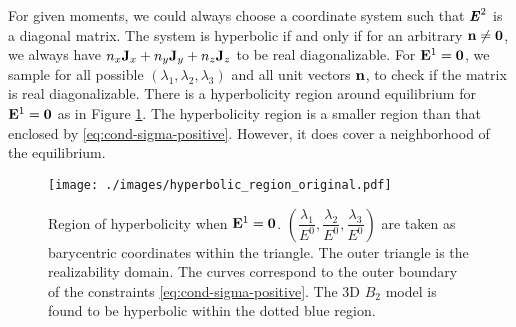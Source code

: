 For given moments, we could always choose a
coordinate system such that $\boldsymbol{\mathit{E}}^2$ is a diagonal matrix. The
system is hyperbolic if and only if for an arbitrary
$\mathbf{n} \not= \boldsymbol{0}$, we always have
$n_x \mathbf{J}_x + n_y \mathbf{J}_y + n_z \mathbf{J}_z$ to be real diagonalizable.
For $\mathbf{E}^1 = \boldsymbol{0}$, we sample for all possible
$(\lambda_1, \lambda_2, \lambda_3)$ and all unit vectors $\mathbf{n}$, to
check if the matrix is real diagonalizable.
There is a hyperbolicity region around equilibrium for $\mathbf{E}^1 =
\boldsymbol{0}$ as in Figure \ref{fig:hyperbolic_region}. 
The hyperbolicity region is a smaller
region than that enclosed by \eqref{eq:cond-sigma-positive}. However, it does cover a
neighborhood of the equilibrium.
\begin{figure}  
  \centering
  \texttt{[image: ./images/hyperbolic\_region\_original.pdf]}
  \caption{Region of hyperbolicity when $\mathbf{E}^1 = \boldsymbol{0}$.
    $\left(\dfrac{\lambda_1}{E^0},\dfrac{\lambda_2}{E^0},
    \dfrac{\lambda_3}{E^0}\right)$ are taken as barycentric coordinates within the 
    triangle. The outer triangle is the realizability domain. The curves
    correspond to the outer boundary of the constraints \eqref{eq:cond-sigma-positive}.
    The 3D $B_2$ model is found to be hyperbolic within the dotted blue region. 
  }
  \label{fig:hyperbolic_region}
\end{figure}

